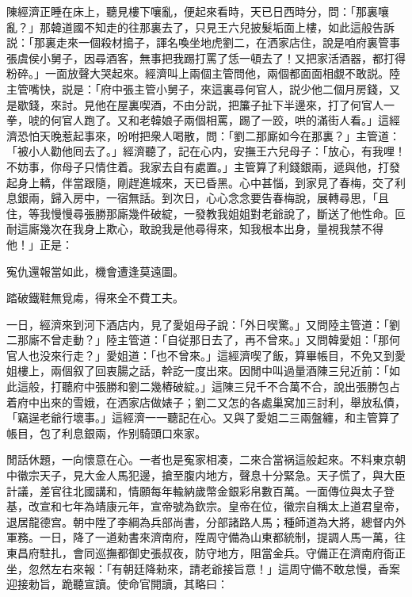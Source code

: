陳經濟正睡在床上，聽見樓下嚷亂，便起來看時，天已日西時分，問：「那裏嚷亂？」那韓道國不知走的往那裏去了，只見王六兒披髮垢面上樓，如此這般告訴説：「那裏走來一個殺材搗子，諢名喚坐地虎劉二，在洒家店住，說是咱府裏管事張虞侯小舅子，因尋酒客，無事把我踢打罵了恁一頓去了！又把家活酒器，都打得粉碎。」一面放聲大哭起來。經濟叫上兩個主管問他，兩個都面面相覷不敢説。陸主管嘴快，説是：「府中張主管小舅子，來這裏尋何官人，説少他二個月房錢，又是歇錢，來討。見他在屋裏喫酒，不由分説，把簾子扯下半邊來，打了何官人一拳，唬的何官人跑了。又和老韓娘子兩個相罵，踢了一跤，哄的滿街人看。」這經濟恐怕天晚惹起事來，吩咐把衆人喝散，問：「劉二那廝如今在那裏？」主管道：「被小人勸他囘去了。」經濟聽了，記在心内，安撫王六兒母子：「放心，有我哩！不妨事，你母子只情住着。我家去自有處置。」主管算了利錢銀兩，遞與他，打發起身上轎，伴當跟隨，剛趕進城來，天已昏黑。心中甚惱，到家見了春梅，交了利息銀兩，歸入房中，一宿無話。到次日，心心念念要告春梅說，展轉尋思，「且住，等我慢慢尋張勝那廝幾件破綻，一發教我姐姐對老爺說了，斷送了他性命。叵耐這廝幾次在我身上欺心，敢說我是他尋得來，知我根本出身，量視我禁不得他！」正是：

\begin{myquote}
寃仇還報當如此，機會遭逢莫遠圖。

踏破鐵鞋無覓䖏，得來全不費工夫。
\end{myquote}

一日，經濟來到河下酒店内，見了愛姐母子說：「外日喫驚。」又問陸主管道：「劉二那廝不曾走動？」陸主管道：「自従那日去了，再不曾來。」又問韓愛姐：「那何官人也没來行走？」愛姐道：「也不曾來。」這經濟喫了飯，算畢帳目，不免又到愛姐樓上，兩個叙了回衷腸之話，幹訖一度出來。因閒中叫過量酒陳三兒近前：「如此這般，打聽府中張勝和劉二幾樁破綻。」這陳三兒千不合萬不合，說出張勝包占着府中出來的雪娥，在洒家店做婊子；劉二又怎的各處巢窝加三討利，舉放私債，「竊逞老爺行壞事。」這經濟一一聽記在心。又與了愛姐二三兩盤纏，和主管算了帳目，包了利息銀兩，作别騎頭口來家。

閒話休題，一向懷意在心。一者也是寃家相凑，二來合當祸這般起來。不料東京朝中徽宗天子，見大金人馬犯邊，搶至腹内地方，聲息十分緊急。天子慌了，與大臣計議，差官往北國講和，情願每年輸納歲幣金銀彩帛數百萬。一面傳位與太子登基，改宣和七年為靖康元年，宣帝號為欽宗。皇帝在位，徽宗自稱太上道君皇帝，退居龍德宫。朝中陞了李綱為兵部尚書，分部諸路人馬；種師道為大將，總督内外軍務。一日，降了一道勑書來濟南府，陞周守備為山東都統制，提調人馬一萬，往東昌府駐扎，會同巡撫都御史張叔夜，防守地方，阻當金兵。守備正在濟南府衙正坐，忽然左右來報：「有朝廷降勑來，請老爺接旨意！」這周守備不敢怠慢，香案迎接勅旨，跪聽宣讀。使命官開讀，其略曰：

